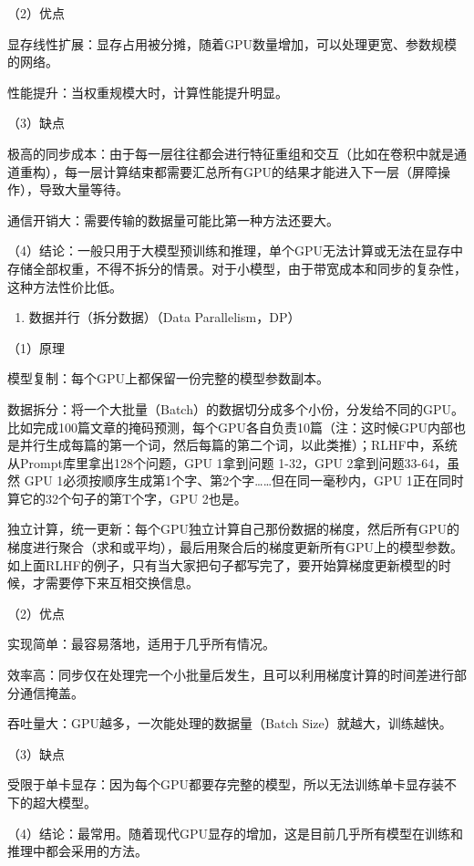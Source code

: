 （2）优点

显存线性扩展：显存占用被分摊，随着GPU数量增加，可以处理更宽、参数规模的网络。

性能提升：当权重规模大时，计算性能提升明显。

（3）缺点

极高的同步成本：由于每一层往往都会进行特征重组和交互（比如在卷积中就是通道重构），每一层计算结束都需要汇总所有GPU的结果才能进入下一层（屏障操作），导致大量等待。

通信开销大：需要传输的数据量可能比第一种方法还要大。

（4）结论：一般只用于大模型预训练和推理，单个GPU无法计算或无法在显存中存储全部权重，不得不拆分的情景。对于小模型，由于带宽成本和同步的复杂性，这种方法性价比低。

\begin{enumerate}
\def\labelenumi{\arabic{enumi}.}
\setcounter{enumi}{2}
\tightlist
\item
  数据并行（拆分数据）（Data Parallelism，DP）
\end{enumerate}

（1）原理

模型复制：每个GPU上都保留一份完整的模型参数副本。

数据拆分：将一个大批量（Batch）的数据切分成多个小份，分发给不同的GPU。比如完成100篇文章的掩码预测，每个GPU各自负责10篇（注：这时候GPU内部也是并行生成每篇的第一个词，然后每篇的第二个词，以此类推）；RLHF中，系统从Prompt库里拿出128个问题，GPU 1拿到问题 1-32，GPU 2拿到问题33-64，虽然 GPU 1必须按顺序生成第1个字、第2个字\ldots\ldots 但在同一毫秒内，GPU 1正在同时算它的32个句子的第T个字，GPU 2也是。

独立计算，统一更新：每个GPU独立计算自己那份数据的梯度，然后所有GPU的梯度进行聚合（求和或平均），最后用聚合后的梯度更新所有GPU上的模型参数。如上面RLHF的例子，只有当大家把句子都写完了，要开始算梯度更新模型的时候，才需要停下来互相交换信息。

（2）优点

实现简单：最容易落地，适用于几乎所有情况。

效率高：同步仅在处理完一个小批量后发生，且可以利用梯度计算的时间差进行部分通信掩盖。

吞吐量大：GPU越多，一次能处理的数据量（Batch Size）就越大，训练越快。

（3）缺点

受限于单卡显存：因为每个GPU都要存完整的模型，所以无法训练单卡显存装不下的超大模型。

（4）结论：最常用。随着现代GPU显存的增加，这是目前几乎所有模型在训练和推理中都会采用的方法。

